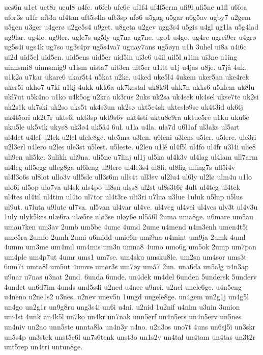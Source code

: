 {ues6n
u1et
uet8r
ueul8
u4fe.
u6feb
ufe6e
uf1f4
uf4f5erm
ufi9l
ufi5ne
u1fl
u6foa
ufor3s
u1fr
uft3a
uf4tan
uft5s4la
uft3sp
ufø6
u5gag
u5gar
u6g5av
ugby7
u2gem
u5gen
u3ger
u4gerø
u2ge5s4
u9get.
u8geta
u2gev
ugg3s4
u5gis
u4gl
ug1la
u5g4lad
ug9lar.
ug4le.
ug9ler.
ugle7s
ug5ly
ug7na
ug7ne.
ugo1
u4go.
ug4re
ugrei9er
u4grø
ug5s4i
ugs4k
ug7so
ug3s4pr
ug5s4va7
uguay7ans
ug5øyn
u1h
3uhel
ui8a
u4i6c
ui2d
uid5el
uid5en.
uid5ens
uid5er
uid5in
ui3e6
u4il
uil5l
u1im
ui3ne
u1ing
uinnsmi8
uinnsmig9
u1ism
uista7
uit3en
uit5er
u1itt
u1j
u4jas
u8je.
u7jå
4uk.
u1k2a
u7kar
ukare6
ukar5t4
u5kat
u2ke.
u4ked
uke5l4
4ukem
uker5an
uke4rek
uker5i
ukho7
u7ki
u1kj
4ukk
ukk6a
uk7kestal
uk8k9l
ukk7n
ukks6
u5klem
uk8lu
ukl7ut
u5k4no
u1ko
u4k5og
u2kra
uk3rus
2uks
uk2sa
uk4sek
uk4sel
ukse7te
uk2si
uk2s1k
uk7ski
uk2so
uks5t
uk4s3un
uk2sø
ukt5e4sk
ukteslø9se
uk4t3id
uk6tj
uk4t5ori
uk2t7r
ukts6l
ukt3sp
ukt9s6v
ukt4sti
uktu8e9ra
uktue5re
u1ku
uku6e
uku5le
uk5vik
ukys8
uk3ø4
uk5å4
6ul.
u1la
u4la.
ula7d
u6l1af
ul3aks
ul5art
ul4det
u4lef
u2lek
u2lel
ulele8ge.
ule5ma
u3len.
u6leni
u3lens
u5ler.
u5lere.
ule3ri
u2l3erl
u4lero
u2les
ule3st
u5lest.
u5leste.
u2leu
u1lé
ul4f5l
ul4fo
ul4fr
u3l4i
ulie8
uli9en
uli5ke.
3ulikh
uli9na.
uli5ne
u7linj
ul1j
ul5ka
ul4k3v
ul4lag
ul4lam
ull7arm
ul4leg
ull5egg
ulleg8ga
ul6leng
ul9lere
ul4le3s4
ul8li.
ul8lig
ulling7s
ull5i4v
ul4l3o6s
ul8lot
ullo3v
ull5sle
ull3s6m
ulls4t
ull3sv
ul2lu4
ul6ly
ul2lø
ulm4u
u1lo
ulo6i
ul5op
ulo7va
ul4sk
uls4po
ul8sn
ulss8
ul2st
ul8s3t6r
4ult
ul4teg
ul4tek
ul4tes
ul4til
ul4tim
ul4to
ul7tor
ul4t3re
ult3ri
u7lua
u3lue
1uluk
u5lup
u5lus
ul9ut.
u7luta
u9lute
ul7va.
ul5van
ul4var
ul4ve.
ul4veg
ul4vei
ul4ves
ulv3t
ul4v3u
1uly
ulyk5kes
ulæ6ra
ulæ5re
ulø3se
uløy6e
ul5å6l
2uma
uma8ge.
u6mare
um5au
umau7ken
um3av
2umb
um5be
4umc
4umd
2ume
u4mend
u4m3enh
umen4t5i
ume5ra
2umfo
2umh
2umi
u6midd
umie6n
umi9na
u4mint
um9ja
2umk
4uml
4umm
um3me
um4mil
um4mis
um3n
umna8
4umo
umo6g
um5ok
2ump
um7pan
um4ple
um4p7ut
4umr
ums1
um7se.
um4sku
umsku8le.
um2sn
um4sor
ums3t
6um7t
umta8l
um5ut
4umve
umør3s
um7øy
umå7
2un.
una6da
un5alg
u4n3ap
u9nar
u7nas
u3nat
2und.
6unda
6unde.
un4dek
un4del
6unden
5undersk
5underv
4undet
un6d7im
4unds
und5s4i
u2ned
u4nee
u9nei.
u2nel
unele6ge.
u4n5eng
u4neno
u2ne1s2
u3nes.
u2nev
unev5n
1ungd
ungele8ge.
un4gem
un2g1j
un4g5l
un4go
un2g1r
un9g8ru
ung3s4i
un6i
u4ni.
u2nid
1u2nif
u4nim
u3nin
3union
uni4st
4unk
un4k5l
un7ko
un4kr
un7nak
unn5erf
un4n5ers
un4n5erv
un5nes
un4niv
un2no
unn5ste
unnta8la
un4n3y
u4no.
u2n3os
uno7t
4uns
un6sj5i
un3skr
un5s4p
un3stek
unst5e6l
un7s6tenk
unst3o
un1s2v
un4tal
un4tam
un4tas
un3t2r
unt5rep
un4tri
untun8ge.
}
